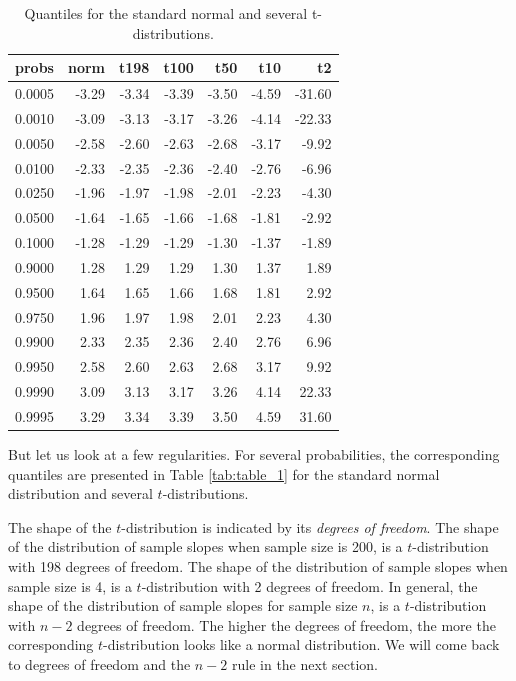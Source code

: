 \documentclass[]{report}\usepackage[]{graphicx}\usepackage[]{color}
\begin{document}
\begin{table}[ht]
\centering
\caption{Quantiles for the standard normal and several t-distributions.} 
\label{tab:nonparmixed_4}
\begin{tabular}{rrrrrrr}
  \hline
probs & norm & t198 & t100 & t50 & t10 & t2 \\ 
  \hline
0.0005 & -3.29 & -3.34 & -3.39 & -3.50 & -4.59 & -31.60 \\ 
  0.0010 & -3.09 & -3.13 & -3.17 & -3.26 & -4.14 & -22.33 \\ 
  0.0050 & -2.58 & -2.60 & -2.63 & -2.68 & -3.17 & -9.92 \\ 
  0.0100 & -2.33 & -2.35 & -2.36 & -2.40 & -2.76 & -6.96 \\ 
  0.0250 & -1.96 & -1.97 & -1.98 & -2.01 & -2.23 & -4.30 \\ 
  0.0500 & -1.64 & -1.65 & -1.66 & -1.68 & -1.81 & -2.92 \\ 
  0.1000 & -1.28 & -1.29 & -1.29 & -1.30 & -1.37 & -1.89 \\ 
  0.9000 & 1.28 & 1.29 & 1.29 & 1.30 & 1.37 & 1.89 \\ 
  0.9500 & 1.64 & 1.65 & 1.66 & 1.68 & 1.81 & 2.92 \\ 
  0.9750 & 1.96 & 1.97 & 1.98 & 2.01 & 2.23 & 4.30 \\ 
  0.9900 & 2.33 & 2.35 & 2.36 & 2.40 & 2.76 & 6.96 \\ 
  0.9950 & 2.58 & 2.60 & 2.63 & 2.68 & 3.17 & 9.92 \\ 
  0.9990 & 3.09 & 3.13 & 3.17 & 3.26 & 4.14 & 22.33 \\ 
  0.9995 & 3.29 & 3.34 & 3.39 & 3.50 & 4.59 & 31.60 \\ 
   \hline
\end{tabular}
\end{table}

But let us look at a few regularities. For several probabilities, the corresponding quantiles are presented in Table \ref{tab:table_1} for the standard normal distribution and several $t$-distributions.

The shape of the $t$-distribution is indicated by its \textit{degrees of freedom}. The shape of the distribution of sample slopes when sample size is 200, is a $t$-distribution with 198 degrees of freedom. The shape of the distribution of sample slopes when sample size is 4, is a $t$-distribution with 2 degrees of freedom. In general, the shape of the distribution of sample slopes for sample size $n$, is a $t$-distribution with $n-2$ degrees of freedom. The higher the degrees of freedom, the more the corresponding $t$-distribution looks like a normal distribution. We will come back to degrees of freedom and the $n-2$ rule in the next section.
\end{document}
